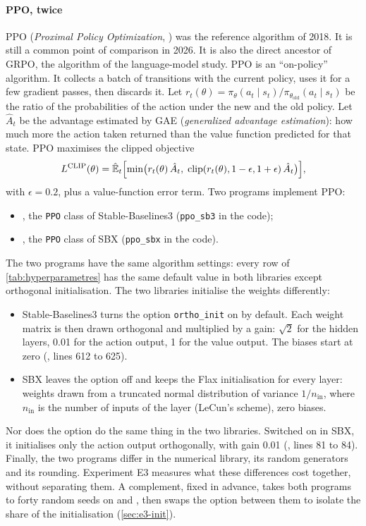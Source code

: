 \paragraph{PPO, twice}
PPO (\emph{Proximal Policy Optimization}, \cite{schulman2017ppo}) was the reference algorithm of 2018. It is
still a common point of comparison in 2026. It is also the direct ancestor of GRPO, the algorithm of
the language-model study. PPO is an \enquote{on-policy} algorithm. It collects a batch of transitions with the
current policy, uses it for a few gradient passes, then discards it. Let
$r_t(\theta) = \pi_\theta(a_t\mid s_t)/\pi_{\theta_{\text{old}}}(a_t\mid s_t)$ be the ratio of the
probabilities of the action under the new and the old policy. Let $\hat A_t$ be the advantage estimated by GAE
(\emph{generalized advantage estimation}): how much more the action taken returned than the value function
predicted for that state. PPO maximises the clipped objective
\begin{equation}\label{eq:ppo}
  L^{\text{CLIP}}(\theta) = \hat{\mathbb{E}}_t\Bigl[\min\bigl(r_t(\theta)\,\hat A_t,\;
  \operatorname{clip}(r_t(\theta), 1-\epsilon, 1+\epsilon)\,\hat A_t\bigr)\Bigr],
\end{equation}
with $\epsilon = 0.2$, plus a value-function error term. Two programs implement PPO:
\begin{itemize}
  \item {}, the \texttt{PPO} class of Stable-Baselines3 (\texttt{ppo\_sb3} in the code);
  \item {}, the \texttt{PPO} class of SBX (\texttt{ppo\_sbx} in the code).
\end{itemize}
The two programs have the same algorithm settings: every row of \cref{tab:hyperparametres} has the same
default value in both libraries except orthogonal initialisation. The two libraries initialise the weights
differently:
\begin{itemize}
  \item Stable-Baselines3 turns the option \texttt{ortho\_init} on by default. Each weight matrix is then drawn
    orthogonal and multiplied by a gain: $\sqrt2$ for the hidden layers, 0.01 for the action output, 1 for the
    value output. The biases start at zero (, lines 612 to 625).
  \item SBX leaves the option off and keeps the Flax initialisation for every layer: weights drawn from a
    truncated normal distribution of variance $1/n_{\text{in}}$, where $n_{\text{in}}$ is the number of inputs
    of the layer (LeCun's scheme), zero biases.
\end{itemize}
Nor does the option do the same thing in the two libraries. Switched on in SBX, it initialises only the
action output orthogonally, with gain 0.01 (, lines 81 to 84). Finally, the two
programs differ in the numerical library, its random generators and its rounding. Experiment E3 measures what
these differences cost together, without separating them. A complement, fixed in advance, takes both
programs to forty random seeds on  and , then swaps the option between them to
isolate the share of the initialisation (\cref{sec:e3-init}).

